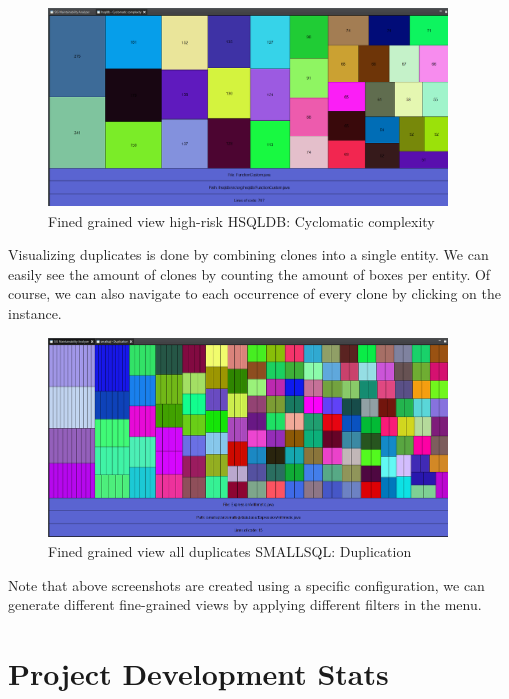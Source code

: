 \documentclass{article}
\begin{document}
\begin{figure}[!htbp]
	\centering
	\label{fig:cyclomatic-complexity}
	\caption{Fined grained view high-risk HSQLDB: Cyclomatic complexity}
	\includegraphics[width=400px, height=200px]{hsqldb_coc.png}
\end{figure}

\clearpage 

Visualizing duplicates is done by combining clones into a single entity. 
We can easily see the amount of clones by counting the amount of boxes per entity.
Of course, we can also navigate to each occurrence of every clone by clicking on the instance.

\begin{figure}[!htbp]
	\centering
	\label{fig:duplication}
	\caption{Fined grained view all duplicates SMALLSQL: Duplication}
	\includegraphics[width=400px, height=200px]{smallsql_duplication.png}
\end{figure}

Note that above screenshots are created using a specific configuration, we can generate different fine-grained views by applying different filters in the menu.

\section{Project Development Stats}
\end{document}
